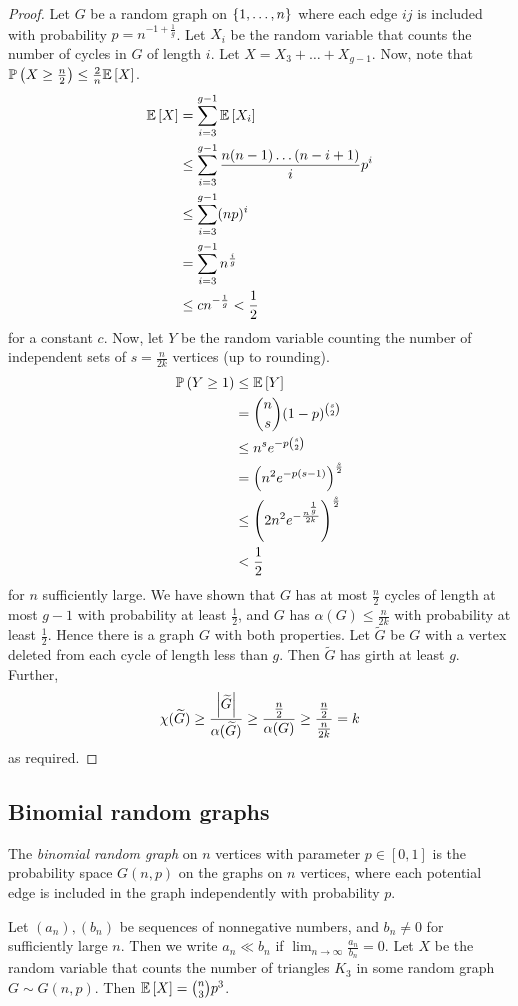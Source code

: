 \begin{proof}
	Let \( G \) be a random graph on \( \qty{1, \dots, n} \) where each edge \( ij \) is included with probability \( p = n^{-1 + \frac{1}{g}} \).
	Let \( X_i \) be the random variable that counts the number of cycles in \( G \) of length \( i \).
	Let \( X = X_3 + \dots + X_{g-1} \).
	Now, note that \( \mathbb{P}\left({X \geq \frac{n}{2}}\right) \leq \frac{2}{n} \mathbb{E}\left[{X}\right] \).
	\begin{align*}
		\mathbb{E}\left[{X}\right] &= \sum_{i=3}^{g-1} \mathbb{E}\left[{X_i}\right] \\
		&\leq \sum_{i=3}^{g-1} \frac{n(n-1) \dots (n-i+1)}{i} p^i \\
		&\leq \sum_{i=3}^{g-1} (np)^i \\
		&= \sum_{i=3}^{g-1} n^{\frac{i}{g}} \\
		&\leq c n^{-\frac{1}{g}} < \frac{1}{2}
	\end{align*}
	for a constant \( c \).
	Now, let \( Y \) be the random variable counting the number of independent sets of \( s = \frac{n}{2k} \) vertices (up to rounding).
	\begin{align*}
		\mathbb{P}\left({Y \geq 1}\right) &\leq \mathbb{E}\left[{Y}\right] \\
		&= \binom n s (1-p)^{\binom s 2} \\
		&\leq n^s e^{-p\binom s 2} \\
		&= \qty(n^2 e^{-p(s-1)})^{\frac{s}{2}} \\
		&\leq \qty(2n^2 e^{-\frac{n^{\frac 1 g}}{2k}})^{\frac{s}{2}} \\
		&< \frac{1}{2}
	\end{align*}
	for \( n \) sufficiently large.
	We have shown that \( G \) has at most \( \frac{n}{2} \) cycles of length at most \( g - 1 \) with probability at least \( \frac{1}{2} \), and \( G \) has \( \alpha(G) \leq \frac{n}{2k} \) with probability at least \( \frac{1}{2} \).
	Hence there is a graph \( G \) with both properties.
	Let \( \widetilde G \) be \( G \) with a vertex deleted from each cycle of length less than \( g \).
	Then \( \widetilde G \) has girth at least \( g \).
	Further,
	\[ \chi(\widetilde G) \geq \frac{\abs{\widetilde G}}{\alpha(\widetilde G)} \geq \frac{\frac{n}{2}}{\alpha(G)} \geq \frac{\frac{n}{2}}{\frac{n}{2k}} = k \]
	as required.
\end{proof}

\subsection{Binomial random graphs}
\begin{definition}
	The \emph{binomial random graph} on \( n \) vertices with parameter \( p \in [0,1] \) is the probability space \( G(n,p) \) on the graphs on \( n \) vertices, where each potential edge is included in the graph independently with probability \( p \).
\end{definition}
Let \( (a_n), (b_n) \) be sequences of nonnegative numbers, and \( b_n \neq 0 \) for sufficiently large \( n \).
Then we write \( a_n \ll b_n \) if \( \lim_{n \to \infty} \frac{a_n}{b_n} = 0 \).
Let \( X \) be the random variable that counts the number of triangles \( K_3 \) in some random graph \( G \sim G(n,p) \).
Then \( \mathbb{E}\left[{X}\right] = \binom n 3 p^3 \).

